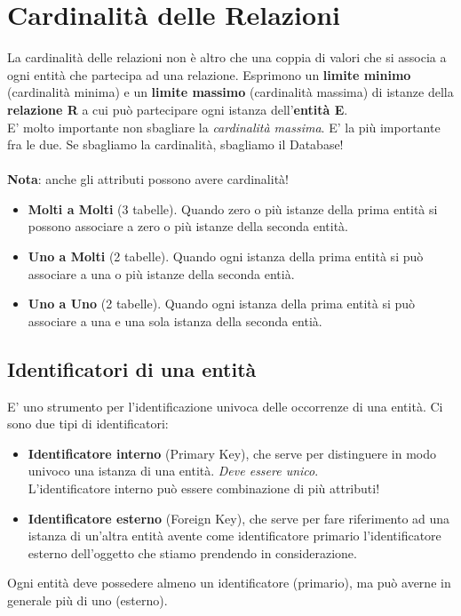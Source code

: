 \documentclass[12pt, a4paper]{article}
\begin{document}
    \section{Cardinalità delle Relazioni}
    La cardinalità delle relazioni non è altro che una coppia di valori che si associa
    a ogni entità che partecipa ad una relazione. 
    Esprimono un \textbf{limite minimo} (cardinalità minima) e un \textbf{limite massimo}
    (cardinalità massima) di istanze della \textbf{relazione R} a cui può partecipare ogni
    istanza dell'\textbf{entità E}.
    \\
    E' molto importante non sbagliare la \textit{cardinalità massima}. E' la più importante fra le due.
    Se sbagliamo la cardinalità, sbagliamo il Database!
    \\\\
    \textbf{Nota}: anche gli attributi possono avere cardinalità!
    \begin{itemize}
        \item \textbf{Molti a Molti} (3 tabelle). Quando zero o più istanze della prima entità si possono associare a zero o più istanze della seconda entità.
        \item \textbf{Uno a Molti} (2 tabelle). Quando ogni istanza della prima entità si può associare a una o più istanze della seconda entià.
        \item \textbf{Uno a Uno} (2 tabelle). Quando ogni istanza della prima entità si può associare a una e una sola istanza della seconda entià.
    \end{itemize}
    \newpage
    \subsection{Identificatori di una entità}
    E' uno strumento per l'identificazione univoca delle occorrenze di una entità.
    Ci sono due tipi di identificatori:
    \begin{itemize}
        \item \textbf{Identificatore interno} (Primary Key), che serve per distinguere in modo univoco una istanza di una entità.
        \textit{Deve essere unico}.
        \\L'identificatore interno può essere combinazione di più attributi!
        \item \textbf{Identificatore esterno} (Foreign Key), che serve per fare riferimento ad una istanza di un'altra entità avente come
        identificatore primario l'identificatore esterno dell'oggetto che stiamo prendendo in considerazione.
    \end{itemize}
    Ogni entità deve possedere almeno un identificatore (primario), ma può averne in generale più di uno (esterno).
\end{document}
